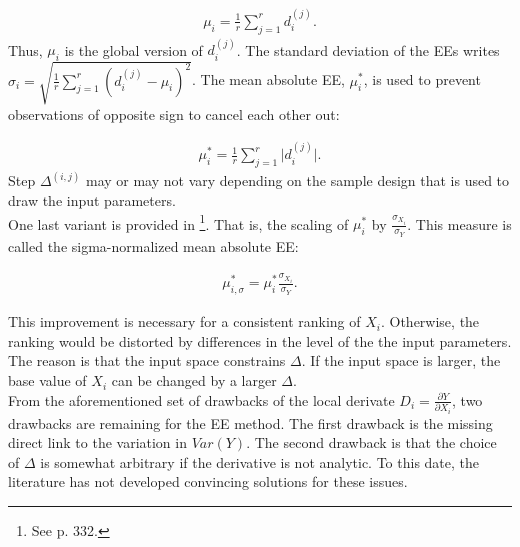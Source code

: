 \begin{align}
\mu_i = \frac{1}{r} \sum_{j=1}^{r} d_i^{(j)}.
\end{align}
\noindent
Thus, $\mu_i$ is the global version of $d_i^{(j)}$. The standard deviation of the EEs writes $\sigma_i = \sqrt{\frac{1}{r} \sum_{j=1}^{r} (d_i^{(j)} - \mu_i)^2}$. The mean absolute EE, $\mu_i^*$, is used to prevent observations of opposite sign to cancel each other out:

\begin{align}
\mu_i^* = \frac{1}{r} \sum_{j=1}^{r} \big| d_i^{(j)} \big|.
\end{align}
\noindent
Step $\Delta^{(i,j)}$ may or may not vary depending on the sample design that is used to draw the input parameters.\\


\noindent
One last variant is provided in \cite{Smith.2014}\footnote{See p. 332.}. That is, the scaling of $\mu_{i}^*$ by $\frac{\sigma_{X_i}}{\sigma_Y}$. This measure is called the sigma-normalized mean absolute EE: 


\begin{align}
\mu_{i,\sigma}^* = \mu_i^* \frac{\sigma_{X_i}}{\sigma_Y}.
\end{align}

\noindent
\noindent
This improvement is necessary for a consistent ranking of $X_i$. Otherwise, the ranking would be distorted by differences in the level of the the input parameters. The reason is that the input space constrains $\Delta$. If the input space is larger, the base value of $X_i$ can be changed by a larger $\Delta$.\\


\noindent
From the aforementioned set of drawbacks of the local derivate $D_i = \frac{\partial Y}{\partial X_i}$, two drawbacks are remaining for the EE method. The first drawback is the missing direct link to the variation in $Var(Y)$. The second drawback is that the choice of $\Delta$ is somewhat arbitrary if the derivative is not analytic. To this date, the literature has not developed convincing solutions for these issues.

